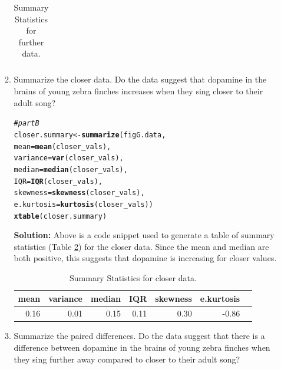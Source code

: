 \documentclass{article}\usepackage[]{graphicx}\usepackage[]{xcolor}
\makeatletter
\newcommand{\hlcom}[1]{\textcolor[rgb]{0.678,0.584,0.686}{\textit{#1}}}%
\newcommand{\hldef}[1]{\textcolor[rgb]{0.345,0.345,0.345}{#1}}%
\newcommand{\hlkwb}[1]{\textcolor[rgb]{0.69,0.353,0.396}{#1}}%
\newcommand{\hlkwc}[1]{\textcolor[rgb]{0.333,0.667,0.333}{#1}}%
\newcommand{\hlkwd}[1]{\textcolor[rgb]{0.737,0.353,0.396}{\textbf{#1}}}%
\newenvironment{kframe}{%
 \def\at@end@of@kframe{}%
 \ifinner\ifhmode%
  \def\at@end@of@kframe{\end{minipage}}%
  \begin{minipage}{\columnwidth}%
 \fi\fi%
 \def\FrameCommand##1{\hskip\@totalleftmargin \hskip-\fboxsep
 \colorbox{shadecolor}{##1}\hskip-\fboxsep
     \hskip-\linewidth \hskip-\@totalleftmargin \hskip\columnwidth}%
 \MakeFramed {\advance\hsize-\width
   \@totalleftmargin\z@ \linewidth\hsize
   \@setminipage}}%
 {\par\unskip\endMakeFramed%
 \at@end@of@kframe}
\newenvironment{knitrout}{}{} %
\makeatother
\begin{document}
\begin{enumerate}
\begin{enumerate}
\begin{table}[ht]
\begin{tabular}{rrrrrrr}
   \hline
\end{tabular}
\caption{Summary Statistics for further data.}
\label{table2}
\end{table}
   \item Summarize the closer data. Do the data suggest that
   dopamine in the brains of young zebra finches increases when
   they sing closer to their adult song?
\begin{knitrout}
\color{fgcolor}\begin{kframe}
\begin{alltt}
 \hlcom{# part B}
 \hldef{closer.summary} \hlkwb{<-} \hlkwd{summarize}\hldef{(figG.data,}
                          \hlkwc{mean} \hldef{=} \hlkwd{mean}\hldef{(closer_vals),}
                          \hlkwc{variance} \hldef{=} \hlkwd{var}\hldef{(closer_vals),}
                          \hlkwc{median} \hldef{=} \hlkwd{median}\hldef{(closer_vals),}
                          \hlkwc{IQR} \hldef{=} \hlkwd{IQR}\hldef{(closer_vals),}
                          \hlkwc{skewness} \hldef{=} \hlkwd{skewness}\hldef{(closer_vals),}
                          \hlkwc{e.kurtosis} \hldef{=} \hlkwd{kurtosis}\hldef{(closer_vals))}
 \hlkwd{xtable}\hldef{(closer.summary)}
\end{alltt}
\end{kframe}
\end{knitrout}
  \textbf{Solution:} Above is a code snippet used to generate a table of summary statistics (Table \ref{table3}) for the closer data. Since the mean and median are both positive, this suggests that dopamine is increasing for closer values. 
\begin{table}[ht]
\centering
\begin{tabular}{rrrrrrr}
  \hline
 mean & variance & median & IQR & skewness & e.kurtosis \\ 
  \hline
 0.16 & 0.01 & 0.15 & 0.11 & 0.30 & -0.86 \\ 
   \hline
\end{tabular}
\caption{Summary Statistics for closer data.}
\label{table3}
\end{table}
  \item Summarize the paired differences. Do the data suggest
  that there is a difference between dopamine in the brains of
  young zebra finches when they sing further away compared to 
  closer to their adult song?
\begin{knitrout}
\color{fgcolor}\begin{kframe}

\end{kframe}
\end{knitrout}
\end{enumerate}
\end{enumerate}
\end{document}

